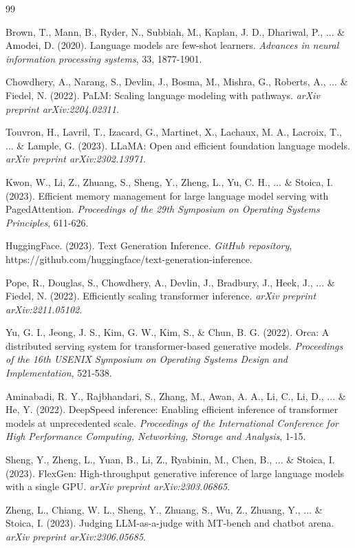 \documentclass{article}
\begin{document}
\begin{thebibliography}{99}

Brown, T., Mann, B., Ryder, N., Subbiah, M., Kaplan, J. D., Dhariwal, P., ... \& Amodei, D. (2020).
Language models are few-shot learners.
\textit{Advances in neural information processing systems}, 33, 1877-1901.

Chowdhery, A., Narang, S., Devlin, J., Bosma, M., Mishra, G., Roberts, A., ... \& Fiedel, N. (2022).
PaLM: Scaling language modeling with pathways.
\textit{arXiv preprint arXiv:2204.02311}.

Touvron, H., Lavril, T., Izacard, G., Martinet, X., Lachaux, M. A., Lacroix, T., ... \& Lample, G. (2023).
LLaMA: Open and efficient foundation language models.
\textit{arXiv preprint arXiv:2302.13971}.

Kwon, W., Li, Z., Zhuang, S., Sheng, Y., Zheng, L., Yu, C. H., ... \& Stoica, I. (2023).
Efficient memory management for large language model serving with PagedAttention.
\textit{Proceedings of the 29th Symposium on Operating Systems Principles}, 611-626.

HuggingFace. (2023).
Text Generation Inference.
\textit{GitHub repository}, https://github.com/huggingface/text-generation-inference.

Pope, R., Douglas, S., Chowdhery, A., Devlin, J., Bradbury, J., Heek, J., ... \& Fiedel, N. (2022).
Efficiently scaling transformer inference.
\textit{arXiv preprint arXiv:2211.05102}.

Yu, G. I., Jeong, J. S., Kim, G. W., Kim, S., \& Chun, B. G. (2022).
Orca: A distributed serving system for transformer-based generative models.
\textit{Proceedings of the 16th USENIX Symposium on Operating Systems Design and Implementation}, 521-538.

Aminabadi, R. Y., Rajbhandari, S., Zhang, M., Awan, A. A., Li, C., Li, D., ... \& He, Y. (2022).
DeepSpeed inference: Enabling efficient inference of transformer models at unprecedented scale.
\textit{Proceedings of the International Conference for High Performance Computing, Networking, Storage and Analysis}, 1-15.

Sheng, Y., Zheng, L., Yuan, B., Li, Z., Ryabinin, M., Chen, B., ... \& Stoica, I. (2023).
FlexGen: High-throughput generative inference of large language models with a single GPU.
\textit{arXiv preprint arXiv:2303.06865}.

Zheng, L., Chiang, W. L., Sheng, Y., Zhuang, S., Wu, Z., Zhuang, Y., ... \& Stoica, I. (2023).
Judging LLM-as-a-judge with MT-bench and chatbot arena.
\textit{arXiv preprint arXiv:2306.05685}.

\end{thebibliography}
\end{document}
